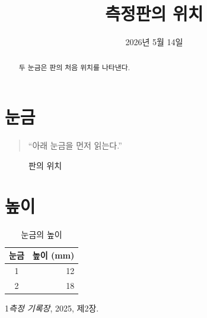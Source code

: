\documentclass{article}
\begin{document}
\title{측정판의 위치}\author{}\date{2026년 5월 14일}\maketitle
\begin{abstract}두 눈금은 판의 처음 위치를 나타낸다.\end{abstract}
\tableofcontents
\section{눈금}\begin{quote}“아래 눈금을 먼저 읽는다.”\end{quote}
\begin{figure}[ht]\centering\fbox{\rule{0pt}{8mm}\rule{33mm}{0pt}}\caption{판의 위치}\end{figure}
\section{높이}
\begin{table}[ht]\centering\begin{tabular}{cr}눈금&높이 (mm)\\\hline 1&12\\2&18\end{tabular}\caption{눈금의 높이}\end{table}
\begin{thebibliography}{1}\emph{측정 기록장}, 2025, 제2장.\end{thebibliography}
\end{document}
